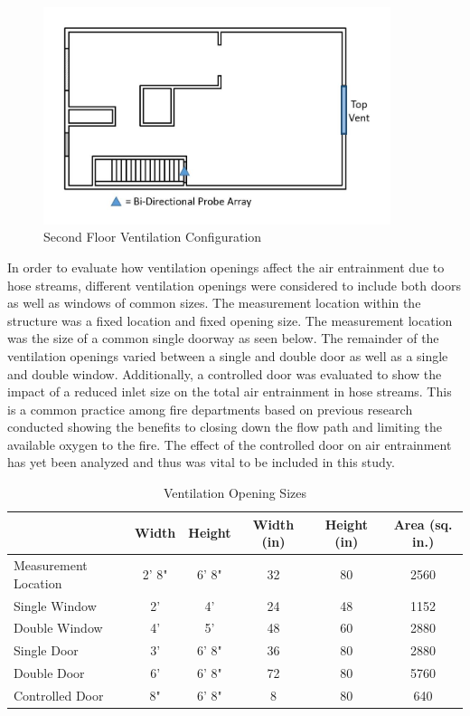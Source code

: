 \documentclass{article}
\begin{document}
\clearpage

\begin{figure}[!ht]
	\centering
	\includegraphics[width=4in]{Figures/Air_Entrainment/Measurement_Location_VentConfig_Top.jpg}
	\caption{Second Floor Ventilation Configuration}
	\label{fig:Second_Floor_Ventilation_Config}
\end{figure}

In order to evaluate how ventilation openings affect the air entrainment due to hose streams, different ventilation openings were considered to include both doors as well as windows of common sizes. The measurement location within the structure was a fixed location and fixed opening size. The measurement location was the size of a common single doorway as seen below. The remainder of the ventilation openings varied between a single and double door as well as a single and double window. Additionally, a controlled door was evaluated to show the impact of a reduced inlet size on the total air entrainment in hose streams. This is a common practice among fire departments based on previous research conducted showing the benefits to closing down the flow path and limiting the available oxygen to the fire. The effect of the controlled door on air entrainment has yet been analyzed and thus was vital to be included in this study.

\vspace*{\baselineskip}

\begin{table}[!ht]
\centering
\caption{Ventilation Opening Sizes}\label{Vent_Sizes}
\begin{tabular}{lccccc}
\toprule[1.5pt]
 & Width & Height & Width (in) & Height (in) & Area (sq. in.) \\ 
\midrule
\multicolumn{1}{l}{Measurement Location} & 2' 8" & 6' 8" & 32 & \multicolumn{1}{c}{80} & 2560 \\
\multicolumn{1}{l}{Single Window} & 2' & 4' & 24 & \multicolumn{1}{c}{48} & 1152 \\
\multicolumn{1}{l}{Double Window} & 4' & 5' & 48 & \multicolumn{1}{c}{60} & 2880 \\
\multicolumn{1}{l}{Single Door} & 3' & 6' 8" & 36 & \multicolumn{1}{c}{80} & 2880 \\
\multicolumn{1}{l}{Double Door} & 6' & 6' 8" & 72 & \multicolumn{1}{c}{80} & 5760 \\
\multicolumn{1}{l}{Controlled Door} & 8" & 6' 8" & 8 & \multicolumn{1}{c}{80} & 640 \\ 
\bottomrule[1.25pt]
\end{tabular}
\end{table}
\end{document}
